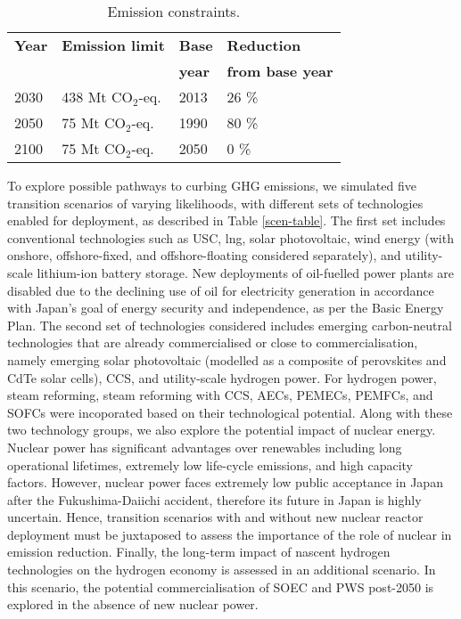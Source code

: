 \begin{table}[!ht]
\centering
	\caption{Emission constraints.}
	\vspace{0.1in}
	\begin{tabularx}{0.6\textwidth}{p{} p{}p{} p{}}
		\hline
\textbf{Year} & \textbf{Emission limit} & \textbf{Base} & \textbf{Reduction} \\
 & & \textbf{year} & \textbf{from base year} \\
\hline
2030 & 438 Mt CO$_2$-eq. & 2013 & 26 \% \\
2050 & 75 Mt CO$_2$-eq. & 1990 & 80 \% \\
2100 & 75 Mt CO$_2$-eq. & 2050 & 0 \% \\
\hline 
	\end{tabularx}
\label{co2-limits}
\end{table}

To explore possible pathways to curbing \gls{GHG} emissions, we simulated five transition scenarios of varying likelihoods, with different sets of technologies enabled for deployment, as described in Table \ref{scen-table}. The first set includes conventional technologies such as  \gls{USC}, \gls{lng}, solar photovoltaic, wind energy (with onshore, offshore-fixed, and offshore-floating considered separately), and utility-scale lithium-ion battery storage. New deployments of oil-fuelled power plants are disabled due to the declining use of oil for electricity generation in accordance with Japan's goal of energy security and independence, as per the Basic Energy Plan. The second set of technologies considered includes emerging carbon-neutral technologies that are already commercialised or close to commercialisation, namely emerging solar photovoltaic (modelled as a composite of perovskites and CdTe solar cells), \gls{CCS}, and utility-scale hydrogen power. For hydrogen power, steam reforming, steam reforming with \gls{CCS}, \glspl{AEC}, \glspl{PEMEC}, \glspl{PEMFC}, and \glspl{SOFC} were incoporated based on their technological potential. Along with these two technology groups, we also explore the potential impact of nuclear energy. Nuclear power has significant advantages over renewables including long operational lifetimes, extremely low life-cycle emissions, and high capacity factors. However, nuclear power faces extremely low public acceptance in Japan after the Fukushima-Daiichi accident, therefore its future in Japan is highly uncertain. Hence, transition scenarios with and without new nuclear reactor deployment must be juxtaposed to assess the importance of the role of nuclear in emission reduction. Finally, the long-term impact of nascent hydrogen technologies on the hydrogen economy is assessed in an additional scenario. In this scenario, the potential commercialisation of \gls{SOEC} and \gls{PWS} post-2050 is explored in the absence of new nuclear power.

